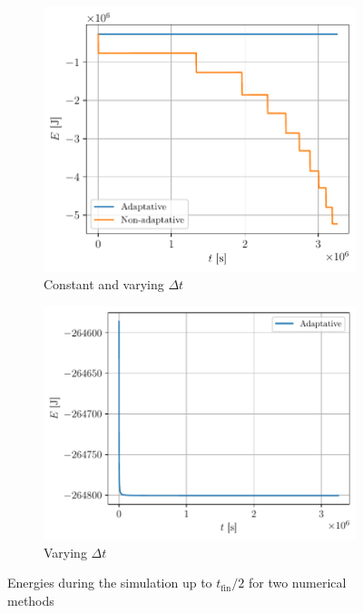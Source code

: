 \begin{figure}[h]
    \centering
    \begin{subfigure}{0.47\linewidth}
        \centering
        \includegraphics[width=\linewidth]{figures/transfert_all_energy.pdf}
        \caption{Constant and varying $\Delta t$}
        \label{fig:transfert_2_energies}
    \end{subfigure}
    \begin{subfigure}{0.52\linewidth}
        \centering
        \includegraphics[width=\linewidth]{figures/transfert_adapt_energy.pdf}
        \caption{Varying $\Delta t$}
        \label{fig:transfert_adapt_energy}
    \end{subfigure}
    \caption{Energies during the simulation up to $t_\mathrm{fin}/2$ for two numerical methods}
    \label{fig:transfert_energies}
\end{figure}

